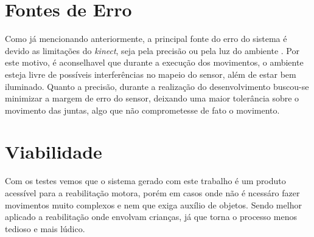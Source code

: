 \section{Fontes de Erro}\label{sol:fontesErro}
  Como já mencionando anteriormente, a principal fonte do erro do sistema é devido as limitações do \textit{kinect}, seja pela precisão ou pela luz do ambiente
. Por este motivo, é aconselhavel que durante a execução dos movimentos, o ambiente esteja livre de possíveis interferências no mapeio do  sensor, além de estar bem iluminado. Quanto a precisão,
durante a realização do desenvolvimento buscou-se minimizar a margem de erro do sensor, deixando uma maior tolerância sobre o movimento das juntas, algo que não comprometesse de fato o movimento.

\section{Viabilidade}\label{sol:viabilidade}
  Com os testes vemos que o sistema gerado com este trabalho é um produto acessível para a reabilitação motora, porém em casos onde não é ncessáro
fazer movimentos muito complexos e nem que exiga auxílio de objetos. Sendo melhor aplicado a reabilitação onde envolvam crianças, já que torna o processo
menos tedioso e mais lúdico.

